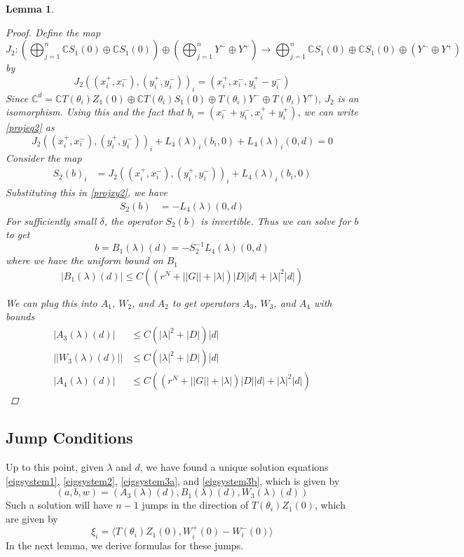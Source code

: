 \documentclass[12pt]{article}
\def\C{{\mathbb C}}
\newtheorem{lemma}{Lemma}
\begin{document}
\begin{lemma}
\begin{proof}
Define the map
\[
J_2: \left( \bigoplus_{j=1}^n \C S_1(0) \oplus \C S_1(0) \right) \oplus
\left( \bigoplus_{j=1}^n Y^- \oplus Y^+ \right) 
\rightarrow \bigoplus_{j=1}^n \C S_1(0) \oplus \C S_1(0) \oplus (Y^- \oplus Y^+)
\]
by 
\[
J_2( (x_i^+, x_i^-),(y_i^+, y_i^-))_i = ( x_i^+, x_i^-, y_i^+ - y_i^- )
\]
Since $\C^d = \C T(\theta_i) Z_1(0) \oplus \C T(\theta_i) S_1(0) \oplus T(\theta_i) Y^- \oplus T(\theta_i) Y^+)$, $J_2$ is an isomorphism. Using this and the fact that $b_i = (x_i^- + y_i^-, x_i^+ + y_i^+)$, we can write \eqref{projeq2} as
\begin{equation}\label{projxy2}
J_2( (x_i^+, x_i^-),(y_i^+, y_i^-))_i 
+ L_4(\lambda)_i(b_i, 0) + L_4(\lambda)_i(0, d) = 0
\end{equation}
Consider the map
\begin{align*}
S_2(b)_i &= J_2( (x_i^+, x_i^-),(y_i^+, y_i^-))_i 
+ L_4(\lambda)_i(b_i, 0) 
\end{align*}
Substituting this in \eqref{projxy2}, we have
\begin{align*}
S_2(b) &= -L_4(\lambda)(0, d)
\end{align*}
For sufficiently small $\delta$, the operator $S_2(b)$ is invertible. Thus we can solve for $b$ to get
\begin{equation}
b = B_1(\lambda)(d) = -S_2^{-1} L_4(\lambda)(0, d)
\end{equation}
where we have the uniform bound on $B_1$
\begin{equation}
|B_1(\lambda)(d)| \leq C \left( (r^{N} + ||G|| + |\lambda|)|D| |d| + |\lambda|^2 |d| \right) 
\end{equation}

We can plug this into $A_1$, $W_2$, and $A_2$ to get operators $A_3$, $W_3$, and $A_4$ with bounds
\begin{align*}
|A_3(\lambda)(d)| &\leq C \left(|\lambda|^2 + |D|\right)|d|\\
||W_3(\lambda)(d)|| &\leq C \left(|\lambda|^2 + |D|\right)|d| \\
|A_4(\lambda)(d)| &\leq 
C\left( (r^N + ||G|| + |\lambda|)|D||d| + |\lambda|^2 |d|  \right)
\end{align*}
\end{proof}
\end{lemma}

\subsection{Jump Conditions}
Up to this point, given $\lambda$ and $d$, we have found a unique solution equations \eqref{eigsystem1}, \eqref{eigsystem2}, \eqref{eigsystem3a}, and \eqref{eigsystem3b}, which is given by
\[
(a, b, w) = (A_3(\lambda)(d), B_1(\lambda)(d), W_3(\lambda)(d))
\]
Such a solution will have $n-1$ jumps in the direction of $T(\theta_i) Z_1(0)$, which are given by
\[
\xi_i = \langle T(\theta_i) Z_1(0), W_i^+(0) - W_i^-(0) \rangle
\]
In the next lemma, we derive formulas for these jumps.
\end{document}

